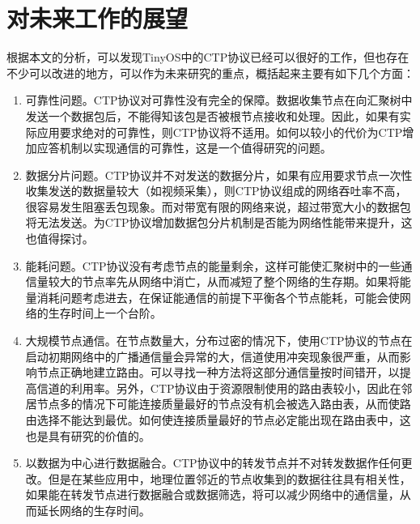 \section{对未来工作的展望}
根据本文的分析，可以发现TinyOS中的CTP协议已经可以很好的工作，但也存在不少可以改进的地方，可以作为未来研究的重点，概括起来主要有如下几个方面：
\vspace{-10pt}
\begin{enumerate}
\item 可靠性问题。CTP协议对可靠性没有完全的保障。数据收集节点在向汇聚树中发送一个数据包后，不能得知该包是否被根节点接收和处理。因此，如果有实际应用要求绝对的可靠性，则CTP协议将不适用。如何以较小的代价为CTP增加应答机制以实现通信的可靠性，这是一个值得研究的问题。

\item 数据分片问题。CTP协议并不对发送的数据分片，如果有应用要求节点一次性收集发送的数据量较大（如视频采集），则CTP协议组成的网络吞吐率不高，很容易发生阻塞丢包现象。而对带宽有限的网络来说，超过带宽大小的数据包将无法发送。为CTP协议增加数据包分片机制是否能为网络性能带来提升，这也值得探讨。

\item 能耗问题。CTP协议没有考虑节点的能量剩余，这样可能使汇聚树中的一些通信量较大的节点率先从网络中消亡，从而减短了整个网络的生存期。如果将能量消耗问题考虑进去，在保证能通信的前提下平衡各个节点能耗，可能会使网络的生存时间上一个台阶。

\item 大规模节点通信。在节点数量大，分布过密的情况下，使用CTP协议的节点在启动初期网络中的广播通信量会异常的大，信道使用冲突现象很严重，从而影响节点正确地建立路由。可以寻找一种方法将这部分通信量按时间错开，以提高信道的利用率。另外，CTP协议由于资源限制使用的路由表较小，因此在邻居节点多的情况下可能连接质量最好的节点没有机会被选入路由表，从而使路由选择不能达到最优。如何使连接质量最好的节点必定能出现在路由表中，这也是具有研究的价值的。

\item 以数据为中心进行数据融合。CTP协议中的转发节点并不对转发数据作任何更改。但是在某些应用中，地理位置邻近的节点收集到的数据往往具有相关性，如果能在转发节点进行数据融合或数据筛选，将可以减少网络中的通信量，从而延长网络的生存时间。

\end{enumerate}
